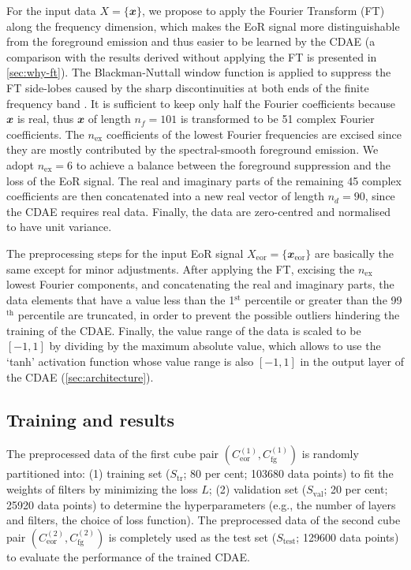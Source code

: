 \documentclass[fleqn,usenatbib]{mnras}
\newcommand{\R}[1]{\mathrm{#1}}
\newcommand{\B}[1]{\mathbfit{#1}}
\newcommand{\editwip}[1]{{\leavevmode\color{magenta}#1}}
\begin{document}
For the input data $X = \{\B{x}\}$, we propose to apply the
Fourier Transform (FT) along the frequency dimension,
which makes the EoR signal more distinguishable from the
foreground emission and thus easier to be learned by the CDAE
(a comparison with the results derived without applying the FT is
presented in \autoref{sec:why-ft}).
The Blackman-Nuttall window function is applied to suppress the
FT side-lobes caused by the sharp discontinuities at both ends
of the finite frequency band \citep[e.g.,][]{chapman2016}.
It is sufficient to keep only half the Fourier coefficients because
$\B{x}$ is real, thus $\B{x}$ of length $n_f = 101$ is transformed to
be 51 complex Fourier coefficients.
The $n_{\R{ex}}$ coefficients of the lowest Fourier frequencies are
excised since they are mostly contributed by the spectral-smooth
foreground emission.
We adopt $n_{\R{ex}} = 6$ to achieve a balance between the foreground
suppression and the loss of the EoR signal.
The real and imaginary parts of the remaining 45 complex coefficients
are then concatenated into a new real vector of length $n_d = 90$,
since the CDAE requires real data.
Finally, the data are zero-centred and normalised to have unit variance.

The preprocessing steps for the input EoR signal
$X_{\R{eor}} = \{\B{x}_{\R{eor}}\}$
are basically the same except for minor adjustments.
After applying the FT, excising the $n_{\R{ex}}$ lowest Fourier
components, and concatenating the real and imaginary parts,
the data elements that have a value less than the 1$^{\R{st}}$
percentile or greater than the 99$^{\R{th}}$ percentile are truncated,
in order to prevent the possible outliers hindering the training of
the CDAE.
Finally, the value range of the data is scaled to be $[-1, 1]$ by
dividing by the maximum absolute value,
which allows to use the `tanh' activation function whose value range
is also $[-1, 1]$ in the output layer of the CDAE
(\autoref{sec:architecture}).


\subsection{Training and results}
\label{sec:results}

\editwip{%
The preprocessed data of the first cube pair
$\left( C_{\R{eor}}^{(1)}, C_{\R{fg}}^{(1)} \right)$
is randomly partitioned into:
(1) training set ($S_{\R{tr}}$; 80 per cent; \num{103680} data points)
to fit the weights of filters by minimizing the loss $L$;
(2) validation set ($S_{\R{val}}$; 20 per cent; \num{25920} data points)
to determine the hyperparameters (e.g., the number of layers and filters,
the choice of loss function).
The preprocessed data of the second cube pair
$\left( C_{\R{eor}}^{(2)}, C_{\R{fg}}^{(2)} \right)$
is completely used as the test set ($S_{\R{test}}$; \num{129600} data
points) to evaluate the performance of the trained CDAE.} %
\end{document}
